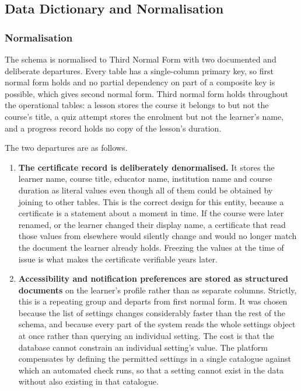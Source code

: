 \documentclass[12pt, oneside]{article} %
\begin{document}
\subsection{Data Dictionary and Normalisation}
\label{sec:data-dict}

\subsubsection{Normalisation}

The schema is normalised to Third Normal Form with two documented and deliberate departures. Every table has a single-column primary key, so first normal form holds and no partial dependency on part of a composite key is possible, which gives second normal form. Third normal form holds throughout the operational tables: a lesson stores the course it belongs to but not the course's title, a quiz attempt stores the enrolment but not the learner's name, and a progress record holds no copy of the lesson's duration.

The two departures are as follows.

\begin{enumerate}
    \item \textbf{The certificate record is deliberately denormalised.} It stores the learner name, course title, educator name, institution name and course duration as literal values even though all of them could be obtained by joining to other tables. This is the correct design for this entity, because a certificate is a statement about a moment in time. If the course were later renamed, or the learner changed their display name, a certificate that read those values from elsewhere would silently change and would no longer match the document the learner already holds. Freezing the values at the time of issue is what makes the certificate verifiable years later.
    \item \textbf{Accessibility and notification preferences are stored as structured documents} on the learner's profile rather than as separate columns. Strictly, this is a repeating group and departs from first normal form. It was chosen because the list of settings changes considerably faster than the rest of the schema, and because every part of the system reads the whole settings object at once rather than querying an individual setting. The cost is that the database cannot constrain an individual setting's value. The platform compensates by defining the permitted settings in a single catalogue against which an automated check runs, so that a setting cannot exist in the data without also existing in that catalogue.
\end{enumerate}
\end{document}
